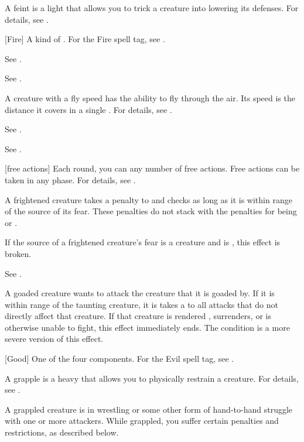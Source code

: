  A feint is a light  that allows you to trick a creature into lowering its defenses.
For details, see .

[Fire] A kind of . For the Fire spell tag, see .

 See .

 See .

 A creature with a fly speed has the ability to fly through the air.
Its speed is the distance it covers in a single .
For details, see .

 See .

 See .

[free actions] Each round, you can any number of free actions.
Free actions can be taken in any phase.
For details, see .

 A frightened creature takes a  penalty to  and checks as long as it is within \rngmed range of the source of its fear.
These penalties do not stack with the penalties for being \shaken or \panicked.

If the source of a frightened creature's fear is a creature and is , this effect is broken.

 See .

 A goaded creature wants to attack the creature that it is goaded by.
If it is within \rngmed range of the taunting creature, it is takes a  to all attacks that do not directly affect that creature.
If that creature is rendered \helpless, surrenders, or is otherwise unable to fight, this effect immediately ends.
The  condition is a more severe version of this effect.

[Good] One of the four  components. For the Evil spell tag, see .

 A grapple is a heavy  that allows you to physically restrain a creature.
For details, see .

 A grappled creature is in wrestling or some other form of hand-to-hand struggle with one or more attackers. While grappled, you suffer certain penalties and restrictions, as described below.

